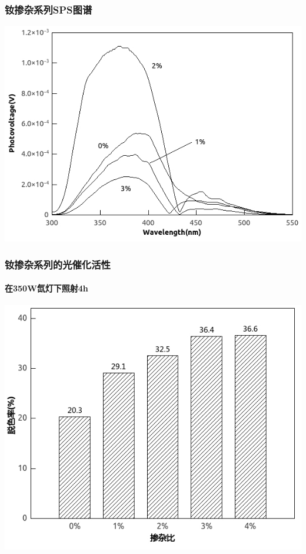 \documentclass[xetex,compress]{mybeamer}
\begin{document}
\begin{frame}
\frametitle{钕掺杂系列SPS图谱}
\begin{block}{}
\centering
\includegraphics[scale=7]{figures/钕掺杂SPS.jpg} 
\end{block}
\end{frame}


\begin{frame}
\frametitle{钕掺杂系列的光催化活性}
\framesubtitle{在350W氙灯下照射4h}
\begin{block}{}
\centering
\includegraphics[scale=6]{figures/钕掺杂活性.jpg} 
\end{block}
\end{frame}
\end{document}
